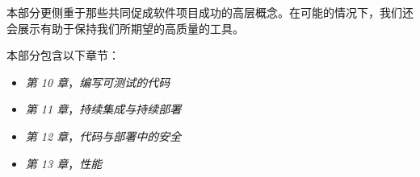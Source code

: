 本部分更侧重于那些共同促成软件项目成功的高层概念。在可能的情况下，我们还会展示有助于保持我们所期望的高质量的工具。

本部分包含以下章节：

\begin{itemize}
\item \emph{第 10 章}，\emph{编写可测试的代码}
\item \emph{第 11 章}，\emph{持续集成与持续部署}
\item \emph{第 12 章}，\emph{代码与部署中的安全}
\item \emph{第 13 章}，\emph{性能}
\end{itemize}
